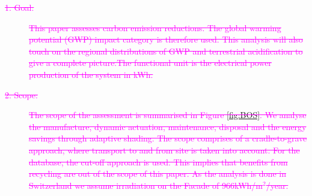 \begin{description}
\item[\textcolor{magenta}{\sout{ 1. Goal:}}] \textcolor{magenta}{\sout{ This paper assesses carbon emission reductions. The global warming potential (GWP) impact category is therefore used. This analysis will also touch on the regional distributions of GWP and terrestrial acidification to give a complete picture.The functional unit is the electrical power production of the system in kWh. }}


\item[\textcolor{magenta}{\sout{ 2. Scope:}}] \textcolor{magenta}{\sout{ The scope of the assessment is summarised in Figure \ref{fig:BOS}. We analyse the  manufacture, dynamic actuation, maintenance, disposal and the energy savings through adaptive shading. The scope comprises of a cradle-to-grave approach, where transport to and from site is taken into account. For the database, the cut-off approach is used. This implies that benefits from recycling are out of the scope of this paper. As the analysis is done in Switzerland we assume irradiation on the Facade of 966kWh/m$^2$/year.}}







\end{description}
